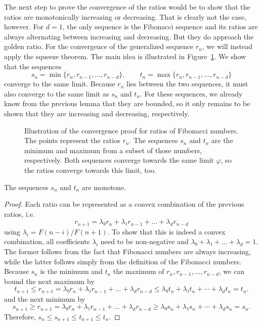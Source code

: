 The next step to prove the convergence of the ratios would be to show that the
ratios are monotonically increasing or decreasing.
That is clearly not the case, however.
For $d=1$, the only sequence is the Fibonacci sequence and its ratios are
always alternating between increasing and decreasing.
But they do approach the golden ratio.
For the convergence of the generalized sequence $r_n$,
we will instead apply the squeeze theorem.
The main idea is illustrated in Figure~\ref{fig:fibonacci-convergence}.
We show that the sequences
\[
  s_n = \min\{r_n, r_{n-1}, …, r_{n-d} \}, \qquad t_n = \max\{r_n, r_{n-1}, …, r_{n-d}\}
\]
converge to the same limit.
Because $r_n$ lies between the two sequences, it must also converge to the same limit as $s_n$ and $t_n$.
For these sequences, we already know from the previous lemma that they are bounded,
so it only remains to be shown that they are increasing and decreasing,
respectively.

\begin{figure}[tbp]
  \centering
  
  \caption{
    Illustration of the convergence proof for ratios of Fibonacci numbers.
    The points represent the ratios $r_n$.
    The sequences $s_n$ and $t_n$ are the minimum and maximum from a subset of
    those numbers, respectively.
    Both sequences converge towards the same limit $φ$, so the ratios converge
    towards this limit, too.
  }
  \label{fig:fibonacci-convergence}
\end{figure}

\begin{lemma}
  The sequences $s_n$ and $t_n$ are monotone.
\end{lemma}

\begin{proof}
  Each ratio can be represented as a convex combination of the previous ratios, i.e.
  \[
    r_{n+1} = λ₀ r_n + λ₁ r_{n-1} + \dots + λ_d r_{n-d}
  \]
  using $λ_i = F(n - i) / F(n + 1)$.
  To show that this is indeed a convex combination, all coefficients $λ_i$
  need to be non-negative and $λ₀ + λ₁ + \dots + \lambda_d = 1$.
  The former follows from the fact that Fibonacci numbers are always increasing,
  while the latter follows simply from the definition of the Fibonacci numbers.
  Because $s_n$ is the minimum and $t_n$ the maximum of $r_n, r_{n-1}, …, r_{n-d}$,
  we can bound the next maximum by
  \[
    t_{n+1} ≤ r_{n+1} = λ₀ r_n + λ₁ r_{n-1} + \dots + λ_d r_{n-d} ≤ λ₀ t_n + λ₁ t_n + ⋯ + λ_d t_n = t_n.
  \]
  and the next minimum by
  \[
    s_{n+1} ≥ r_{n+1} = λ₀ r_n + λ₁ r_{n-1} + \dots + λ_d r_{n-d} ≥ λ₀ s_n + λ₁ s_n + ⋯ + λ_d s_n = s_n.
  \]
  Therefore, $s_n ≤ s_{n+1} ≤ t_{n+1} ≤ t_n$.
\end{proof}

